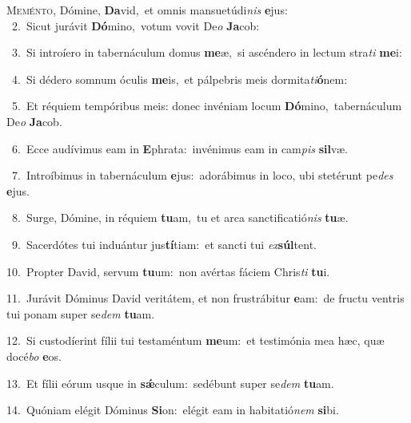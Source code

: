 \lettrine{\initial\textcolor{\initialcolor}{M}}{eménto,} Dómine, \textbf{Da}\-vid,~\star et omnis mansuetúdi\textit{nis} \textbf{e}\-jus:\\
{\numbfont\textcolor{\numbcolor}{~2.}}~Sicut jurávit \textbf{Dó}\-mino,~\star votum vovit De\textit{o} \textbf{Ja}\-cob:\par
{\numbfont\textcolor{\numbcolor}{~3.}}~Si introíero in tabernáculum domus \textbf{me}\-æ,~\star si ascéndero in lectum stra\textit{ti} \textbf{me}\-i:\par
{\numbfont\textcolor{\numbcolor}{~4.}}~Si dédero somnum óculis \textbf{me}\-is,~\star et pálpebris meis dormita\-\textit{ti}\-\textbf{ó}nem:\par
{\numbfont\textcolor{\numbcolor}{~5.}}~Et réquiem tempóribus meis: donec invéniam locum \textbf{Dó}\-mino,~\star tabernáculum De\textit{o} \textbf{Ja}\-cob.\par
{\numbfont\textcolor{\numbcolor}{~6.}}~Ecce audívimus eam in \textbf{E}\-phrata:~\star invénimus eam in cam\textit{pis} \textbf{sil}\-væ.\par
{\numbfont\textcolor{\numbcolor}{~7.}}~Introíbimus in tabernáculum \textbf{e}\-jus:~\star adorábimus in loco, ubi stetérunt pe\textit{des} \textbf{e}\-jus.\par
{\numbfont\textcolor{\numbcolor}{~8.}}~Surge, Dómine, in réquiem \textbf{tu}\-am,~\star tu et arca sanctificatió\textit{nis} \textbf{tu}\-æ.\par
{\numbfont\textcolor{\numbcolor}{~9.}}~Sacerdótes tui induántur jus\-\textbf{tí}\-tiam:~\star et sancti tui \textit{ex}\-\textbf{súl}tent.\par
{\numbfont\textcolor{\numbcolor}{10.}}~Propter David, servum \textbf{tu}\-um:~\star non avértas fáciem Chris\textit{ti} \textbf{tu}\-i.\par
{\numbfont\textcolor{\numbcolor}{11.}}~Jurávit Dóminus David veritátem, et non frustrábitur \textbf{e}\-am:~\star de fructu ventris tui ponam super se\textit{dem} \textbf{tu}\-am.\par
{\numbfont\textcolor{\numbcolor}{12.}}~Si custodíerint fílii tui testaméntum \textbf{me}\-um:~\star et testimónia mea hæc, quæ docé\textit{bo} \textbf{e}\-os.\par
{\numbfont\textcolor{\numbcolor}{13.}}~Et fílii eórum usque in \textbf{sǽ}\-culum:~\star sedébunt super se\textit{dem} \textbf{tu}\-am.\par
{\numbfont\textcolor{\numbcolor}{14.}}~Quóniam elégit Dóminus \textbf{Si}\-on:~\star elégit eam in habitatió\textit{nem} \textbf{si}\-bi.\par
